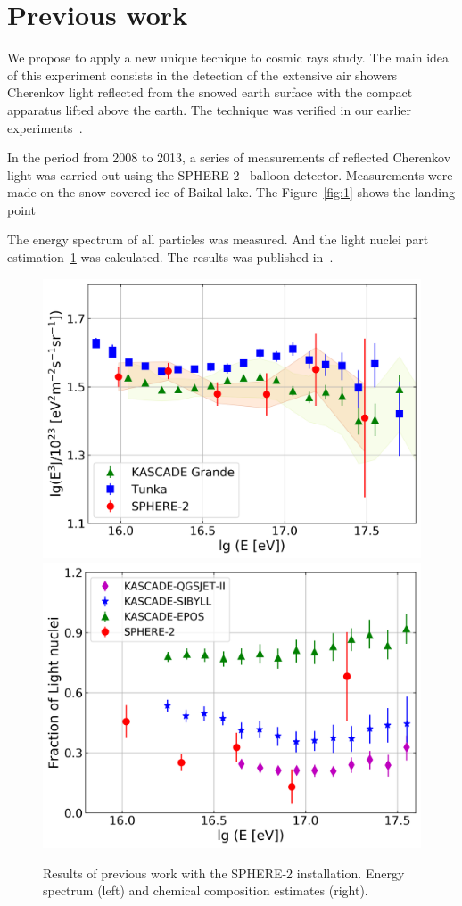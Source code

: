 \documentclass[a4paper,11pt]{article}
\begin{document}
\section{Previous work}

We propose to apply a new unique tecnique to cosmic rays study. The main idea of this experiment consists in the detection of the extensive air showers Cherenkov light reflected from the snowed earth surface with the compact apparatus lifted above the earth. The technique was verified in our earlier experiments~\cite{1,2}.

In the period from 2008 to 2013, a series of measurements of reflected Cherenkov light was carried out using the SPHERE-2~\cite{1,2,3} balloon detector. Measurements were made on the snow-covered ice of Baikal lake. The Figure~\ref{fig:1} shows the landing point

The energy spectrum of all particles was measured. And the light nuclei part estimation~\ref{fig:2} was calculated. The results was published in~\cite{2}. 

\begin{figure}[htbp]
\centering %
\includegraphics[width=.4\textwidth,trim=0 0 0 0,clip]{sphere2spectrum.png}
\qquad
\includegraphics[width=.4\textwidth,origin=c,angle=0]{sphere2composition.png}
\caption{\label{fig:2} Results of previous work with the SPHERE-2 installation. Energy spectrum (left) and chemical composition estimates (right).}
\end{figure}
\end{document}
